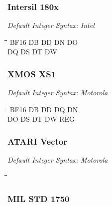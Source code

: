 \subsubsection{Intersil 180x}

{\em Default Integer Syntax: Intel}

{\tt\begin{tabbing}
\hspace{3cm}\=\hspace{3cm}\=\hspace{3cm}\=\hspace{3cm}\=\kill
BF16       \> DB         \> DD        \> DN          \> DO \\
DQ         \> DS         \> DT        \> DW \\
\end{tabbing}}


\subsubsection{XMOS XS1}

{\em Default Integer Syntax: Motorola}

{\tt\begin{tabbing}
\hspace{3cm}\=\hspace{3cm}\=\hspace{3cm}\=\hspace{3cm}\=\kill
BF16       \> DB         \> DD        \> DQ          \> DN \\
DO         \> DS         \> DT        \> DW          \> REG \\
\end{tabbing}}

\subsubsection{ATARI Vector}

{\em Default Integer Syntax: Motorola}

{\tt\begin{tabbing}
\hspace{3cm}\=\hspace{3cm}\=\hspace{3cm}\=\hspace{3cm}\=\kill
\end{tabbing}}

\subsubsection{MIL STD 1750}

